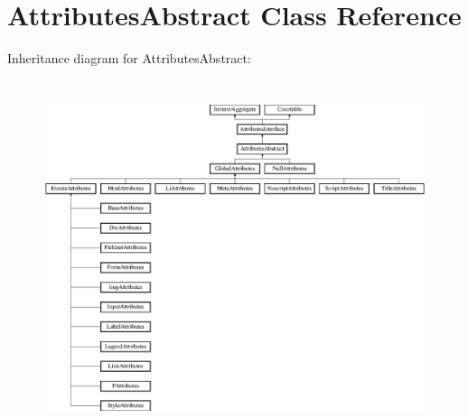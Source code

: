 \hypertarget{class_pes_1_1_dom_1_1_node_1_1_attributes_1_1_attributes_abstract}{}\section{Attributes\+Abstract Class Reference}
\label{class_pes_1_1_dom_1_1_node_1_1_attributes_1_1_attributes_abstract}
Inheritance diagram for Attributes\+Abstract\+:\begin{figure}[H]
\begin{center}
\leavevmode
\includegraphics[height=10.406505cm]{class_pes_1_1_dom_1_1_node_1_1_attributes_1_1_attributes_abstract}
\end{center}
\end{figure}
